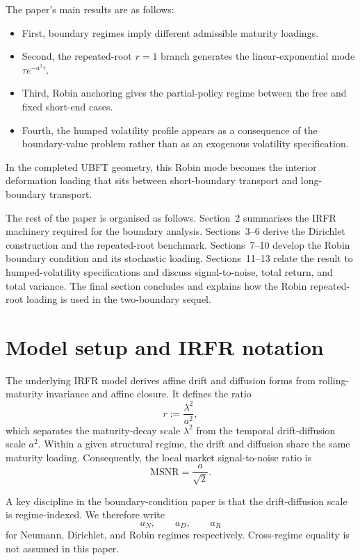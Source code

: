 \documentclass[11pt]{article}
\newcommand{\MSNR}{\mathrm{MSNR}}
\numberwithin{equation}{section}
\begin{document}
The paper's main results are as follows: 
\begin{itemize}
    \item First, boundary regimes imply different admissible maturity loadings.
    \item Second, the repeated-root $r=1$ branch generates the linear-exponential mode $\tau e^{-a^2\tau}$.
    \item Third, Robin anchoring gives the partial-policy regime between the free and fixed short-end cases.
    \item Fourth, the humped volatility profile appears as a consequence of the boundary-value problem rather than as an exogenous volatility specification.
\end{itemize}
    In the completed UBFT geometry, this Robin mode becomes the interior deformation loading that sits between short-boundary transport and long-boundary transport.

The rest of the paper is organised as follows. Section~2 summarises the IRFR machinery required for the boundary analysis. Sections~3--6 derive the Dirichlet construction and the repeated-root benchmark. Sections~7--10 develop the Robin boundary condition and its stochastic loading. Sections~11--13 relate the result to humped-volatility specifications and discuss signal-to-noise, total return, and total variance. The final section concludes and explains how the Robin repeated-root loading is used in the two-boundary sequel.

\section{Model setup and IRFR notation}

The underlying IRFR model derives affine drift and diffusion forms from rolling-maturity invariance and affine closure. It defines the ratio
\begin{equation}
\label{eq:r-ratio}
r:=\frac{\lambda^2}{a^2},
\end{equation}
which separates the maturity-decay scale $\lambda^2$ from the temporal drift-diffusion scale $a^2$. Within a given structural regime, the drift and diffusion share the same maturity loading. Consequently, the local market signal-to-noise ratio is
\begin{equation}
\label{eq:within-regime-msnr}
\MSNR=\frac{a}{\sqrt{2}}.
\end{equation}

A key discipline in the boundary-condition paper is that the drift-diffusion scale is regime-indexed. We therefore write
\begin{equation}
a_N,\qquad a_D,\qquad a_R
\end{equation}
for Neumann, Dirichlet, and Robin regimes respectively. Cross-regime equality is not assumed in this paper.
\end{document}
